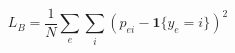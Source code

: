 \par\needspace{70pt}\begin{minipage}{\linewidth}
\begin{equation}L_B=\frac1N\sum_e\sum_i(\widehat p_{ei}-\mathbf1\{y_e=i\})^2\label{eq:15}\end{equation}
\end{minipage}\par
